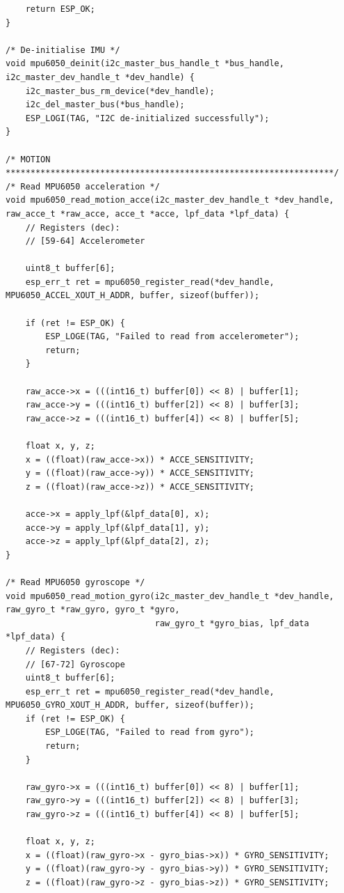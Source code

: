 \begin{lstlisting}
    return ESP_OK;
}

/* De-initialise IMU */
void mpu6050_deinit(i2c_master_bus_handle_t *bus_handle, i2c_master_dev_handle_t *dev_handle) {
    i2c_master_bus_rm_device(*dev_handle);
    i2c_del_master_bus(*bus_handle);
    ESP_LOGI(TAG, "I2C de-initialized successfully");
}

/* MOTION ******************************************************************/
/* Read MPU6050 acceleration */
void mpu6050_read_motion_acce(i2c_master_dev_handle_t *dev_handle, raw_acce_t *raw_acce, acce_t *acce, lpf_data *lpf_data) {
    // Registers (dec):
    // [59-64] Accelerometer

    uint8_t buffer[6];
    esp_err_t ret = mpu6050_register_read(*dev_handle, MPU6050_ACCEL_XOUT_H_ADDR, buffer, sizeof(buffer));

    if (ret != ESP_OK) {
        ESP_LOGE(TAG, "Failed to read from accelerometer");
        return;
    }
    
    raw_acce->x = (((int16_t) buffer[0]) << 8) | buffer[1];
    raw_acce->y = (((int16_t) buffer[2]) << 8) | buffer[3];
    raw_acce->z = (((int16_t) buffer[4]) << 8) | buffer[5];
    
    float x, y, z; 
    x = ((float)(raw_acce->x)) * ACCE_SENSITIVITY;
    y = ((float)(raw_acce->y)) * ACCE_SENSITIVITY;
    z = ((float)(raw_acce->z)) * ACCE_SENSITIVITY;

    acce->x = apply_lpf(&lpf_data[0], x);
    acce->y = apply_lpf(&lpf_data[1], y);
    acce->z = apply_lpf(&lpf_data[2], z);
}

/* Read MPU6050 gyroscope */
void mpu6050_read_motion_gyro(i2c_master_dev_handle_t *dev_handle, raw_gyro_t *raw_gyro, gyro_t *gyro,
                              raw_gyro_t *gyro_bias, lpf_data *lpf_data) {
    // Registers (dec):
    // [67-72] Gyroscope
    uint8_t buffer[6];
    esp_err_t ret = mpu6050_register_read(*dev_handle, MPU6050_GYRO_XOUT_H_ADDR, buffer, sizeof(buffer));
    if (ret != ESP_OK) {
        ESP_LOGE(TAG, "Failed to read from gyro");
        return;
    }

    raw_gyro->x = (((int16_t) buffer[0]) << 8) | buffer[1];
    raw_gyro->y = (((int16_t) buffer[2]) << 8) | buffer[3];
    raw_gyro->z = (((int16_t) buffer[4]) << 8) | buffer[5];
    
    float x, y, z; 
    x = ((float)(raw_gyro->x - gyro_bias->x)) * GYRO_SENSITIVITY;
    y = ((float)(raw_gyro->y - gyro_bias->y)) * GYRO_SENSITIVITY;
    z = ((float)(raw_gyro->z - gyro_bias->z)) * GYRO_SENSITIVITY;


\end{lstlisting}
